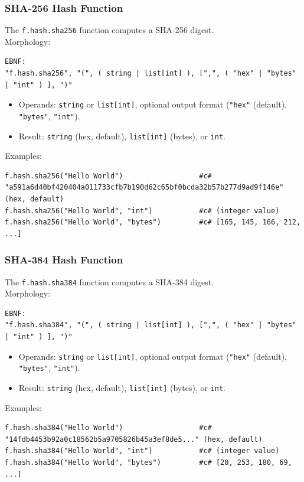 \subsubsection{SHA-256 Hash Function}
The \texttt{f.hash.sha256} function computes a SHA-256 digest. \\
Morphology:
\begin{verbatim}
EBNF:
"f.hash.sha256", "(", ( string | list[int] ), [",", ( "hex" | "bytes" | "int" ) ], ")"
\end{verbatim}
\begin{itemize}
\item Operands: \texttt{string} or \texttt{list[int]}, optional output format (\texttt{"hex"} (default), \texttt{"bytes"}, \texttt{"int"}).
\item Result: \texttt{string} (hex, default), \texttt{list[int]} (bytes), or \texttt{int}.
\end{itemize}
Examples:
\begin{verbatim}
f.hash.sha256("Hello World")                  #c# "a591a6d40bf420404a011733cfb7b190d62c65bf0bcda32b57b277d9ad9f146e" (hex, default)
f.hash.sha256("Hello World", "int")           #c# (integer value)
f.hash.sha256("Hello World", "bytes")         #c# [165, 145, 166, 212, ...]
\end{verbatim}

\subsubsection{SHA-384 Hash Function}
The \texttt{f.hash.sha384} function computes a SHA-384 digest. \\
Morphology:
\begin{verbatim}
EBNF:
"f.hash.sha384", "(", ( string | list[int] ), [",", ( "hex" | "bytes" | "int" ) ], ")"
\end{verbatim}
\begin{itemize}
\item Operands: \texttt{string} or \texttt{list[int]}, optional output format (\texttt{"hex"} (default), \texttt{"bytes"}, \texttt{"int"}).
\item Result: \texttt{string} (hex, default), \texttt{list[int]} (bytes), or \texttt{int}.
\end{itemize}
Examples:
\begin{verbatim}
f.hash.sha384("Hello World")                  #c# "14fdb4453b92a0c18562b5a9705826b45a3ef8de5..." (hex, default)
f.hash.sha384("Hello World", "int")           #c# (integer value)
f.hash.sha384("Hello World", "bytes")         #c# [20, 253, 180, 69, ...]
\end{verbatim}

